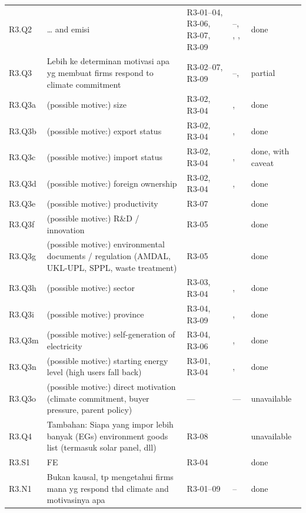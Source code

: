 \begin{longtable}{@{}>{\raggedright\arraybackslash}p{1.2cm}>{\raggedright\arraybackslash}p{7.0cm}>{\raggedright\arraybackslash}p{3.4cm}>{\raggedright\arraybackslash}p{1.9cm}>{\raggedright\arraybackslash}p{2.1cm}@{}}
R3.Q2 & \ldots{} and emisi & R3-01--04, R3-06, R3-07, R3-09 & \pageref{ex:R3-01}--\pageref{ex:R3-04}, \pageref{ex:R3-06}, \pageref{ex:R3-07}, \pageref{ex:R3-09} & done\\
R3.Q3 & Lebih ke determinan motivasi apa yg membuat firms respond to climate commitment & R3-02--07, R3-09 & \pageref{ex:R3-02}--\pageref{ex:R3-07}, \pageref{ex:R3-09} & partial\\
R3.Q3a & (possible motive:) size & R3-02, R3-04 & \pageref{ex:R3-02}, \pageref{ex:R3-04} & done\\
R3.Q3b & (possible motive:) export status & R3-02, R3-04 & \pageref{ex:R3-02}, \pageref{ex:R3-04} & done\\
R3.Q3c & (possible motive:) import status & R3-02, R3-04 & \pageref{ex:R3-02}, \pageref{ex:R3-04} & done, with caveat\\
R3.Q3d & (possible motive:) foreign ownership & R3-02, R3-04 & \pageref{ex:R3-02}, \pageref{ex:R3-04} & done\\
R3.Q3e & (possible motive:) productivity & R3-07 & \pageref{ex:R3-07} & done\\
R3.Q3f & (possible motive:) R\&D / innovation & R3-05 & \pageref{ex:R3-05} & done\\
R3.Q3g & (possible motive:) environmental documents / regulation (AMDAL, UKL-UPL, SPPL, waste treatment) & R3-05 & \pageref{ex:R3-05} & done\\
R3.Q3h & (possible motive:) sector & R3-03, R3-04 & \pageref{ex:R3-03}, \pageref{ex:R3-04} & done\\
R3.Q3i & (possible motive:) province & R3-04, R3-09 & \pageref{ex:R3-04}, \pageref{ex:R3-09} & done\\
R3.Q3m & (possible motive:) self-generation of electricity & R3-04, R3-06 & \pageref{ex:R3-04}, \pageref{ex:R3-06} & done\\
R3.Q3n & (possible motive:) starting energy level (high users fall back) & R3-01, R3-04 & \pageref{ex:R3-01}, \pageref{ex:R3-04} & done\\
R3.Q3o & (possible motive:) direct motivation (climate commitment, buyer pressure, parent policy) & --- & --- & unavailable\\
R3.Q4 & Tambahan: Siapa yang impor lebih banyak (EGs) environment goods list (termasuk solar panel, dll) & R3-08 & \pageref{ex:R3-08} & unavailable\\
R3.S1 & FE & R3-04 & \pageref{ex:R3-04} & done\\
R3.N1 & Bukan kausal, tp mengetahui firms mana yg respond thd climate and motivasinya apa & R3-01--09 & \pageref{ex:R3-01}--\pageref{ex:R3-09} & done\\

\end{longtable}
\normalsize\par{}
